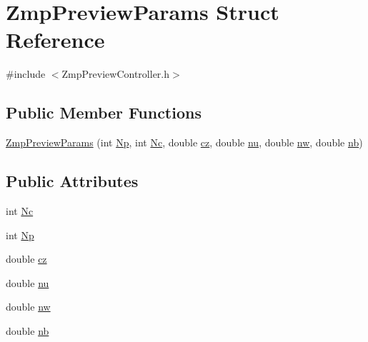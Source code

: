 \hypertarget{structZmpPreviewParams}{\section{\-Zmp\-Preview\-Params \-Struct \-Reference}
\label{structZmpPreviewParams}
}


{\ttfamily \#include $<$\-Zmp\-Preview\-Controller.\-h$>$}

\subsection*{\-Public \-Member \-Functions}
\begin{DoxyCompactItemize}
\item 
\hyperlink{structZmpPreviewParams_a60dc0e7e12bfe40b7a3a5d5704f9ace5}{\-Zmp\-Preview\-Params} (int \hyperlink{structZmpPreviewParams_a04f1e9d5d0bd952d09187e3a67cdf33c}{\-Np}, int \hyperlink{structZmpPreviewParams_adf022d12c133e9a17a41c1a9864fdef0}{\-Nc}, double \hyperlink{structZmpPreviewParams_a4bddbdd99f911c9dddfcb2445da1b7dc}{cz}, double \hyperlink{structZmpPreviewParams_a3be5d92df5593e2a7c5694beaf912dac}{nu}, double \hyperlink{structZmpPreviewParams_ae09ca5b74feda7b0af99c07cd7a36c64}{nw}, double \hyperlink{structZmpPreviewParams_abaa39df27b9d8993a940e753b297dcea}{nb})
\end{DoxyCompactItemize}
\subsection*{\-Public \-Attributes}
\begin{DoxyCompactItemize}
\item 
int \hyperlink{structZmpPreviewParams_adf022d12c133e9a17a41c1a9864fdef0}{\-Nc}
\item 
int \hyperlink{structZmpPreviewParams_a04f1e9d5d0bd952d09187e3a67cdf33c}{\-Np}
\item 
double \hyperlink{structZmpPreviewParams_a4bddbdd99f911c9dddfcb2445da1b7dc}{cz}
\item 
double \hyperlink{structZmpPreviewParams_a3be5d92df5593e2a7c5694beaf912dac}{nu}
\item 
double \hyperlink{structZmpPreviewParams_ae09ca5b74feda7b0af99c07cd7a36c64}{nw}
\item 
double \hyperlink{structZmpPreviewParams_abaa39df27b9d8993a940e753b297dcea}{nb}
\end{DoxyCompactItemize}


